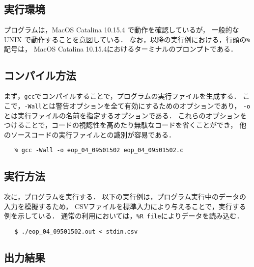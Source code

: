 \documentclass[autodetect-engine,dvi=dvipdfmx,ja=standard,
               a4j,11pt]{bxjsarticle}
\begin{document}
\subsection{実行環境}

プログラムは，MacOS Catalina 10.15.4 で動作を確認しているが，
一般的な UNIX で動作することを意図している．
なお，以降の実行例における，行頭の\verb|%|記号は，
MacOS Catalina 10.15.4におけるターミナルのプロンプトである．

\subsection{コンパイル方法}

まず，\verb|gcc|でコンパイルすることで，プログラムの実行ファイルを生成する．
ここで，\verb|-Wall|とは警告オプションを全て有効にするためのオプションであり，
\verb|-o|とは実行ファイルの名前を指定するオプションである．
これらのオプションをつけることで，コードの視認性を高めたり無駄なコードを省くことができ，
他のソースコードの実行ファイルとの識別が容易である．

{\fontsize{10pt}{11pt} \selectfont
 \begin{verbatim}
   % gcc -Wall -o eop_04_09501502 eop_04_09501502.c
 \end{verbatim}
}

\subsection{実行方法}

次に，プログラムを実行する．
以下の実行例は，プログラム実行中のデータの入力を模擬するため，
CSVファイルを標準入力により与えることで，実行する例を示している．
通常の利用においては，\verb|%R file|によりデータを読み込む．

{\fontsize{10pt}{11pt} \selectfont
 \begin{verbatim}
   $ ./eop_04_09501502.out < stdin.csv
 \end{verbatim}
}

\subsection{出力結果}
\end{document}
